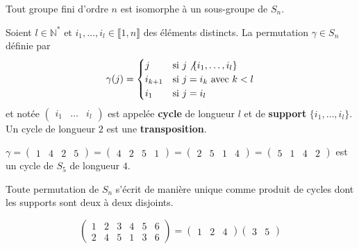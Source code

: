 	\begin{theorem}[Cayley]
		Tout groupe fini d'ordre $n$ est isomorphe à un sous-groupe de $S_n$.
	\end{theorem}
	
	\begin{definition}
		Soient $l \in \mathbb{N}^*$ et $i_1, \dots, i_l \in \llbracket 1, n \rrbracket$ des éléments distincts. La permutation $\gamma \in S_n$ définie par
		\[
			\gamma(j) =
			\begin{cases}
				j &\text{si } j \not \{ i_1, \dots, i_l \} \\
				i_{k+1} &\text{si } j = i_k \text{ avec } k<l \\
				i_1 &\text{si } j=i_l
			\end{cases}
		\]
		et notée $\begin{pmatrix} i_1 & \dots & i_l \end{pmatrix}$ est appelée \textbf{cycle} de longueur $l$ et de \textbf{support} $\{ i_1, \dots, i_l \}$. Un cycle de longueur $2$ est une \textbf{transposition}.
	\end{definition}
	
	\begin{example}
		$\gamma = \begin{pmatrix} 1 & 4 & 2 & 5 \end{pmatrix} = \begin{pmatrix} 4 & 2 & 5 & 1 \end{pmatrix} = \begin{pmatrix} 2 & 5 & 1 & 4 \end{pmatrix} = \begin{pmatrix} 5 & 1 & 4 & 2 \end{pmatrix}$ est un cycle de $S_5$ de longueur $4$.
	\end{example}
	
	\begin{theorem}
		Toute permutation de $S_n$ s'écrit de manière unique comme produit de cycles dont les supports sont deux à deux disjoints.
	\end{theorem}
	
	\begin{example}
		\label{104-3}
		\[
			\begin{pmatrix}
				1 & 2 & 3 & 4 & 5 & 6 \\
				2 & 4 & 5 & 1 & 3 & 6
			\end{pmatrix}
			=
			\begin{pmatrix} 1 & 2 & 4 \end{pmatrix}\begin{pmatrix} 3 & 5 \end{pmatrix}
		\]
	\end{example}
	
